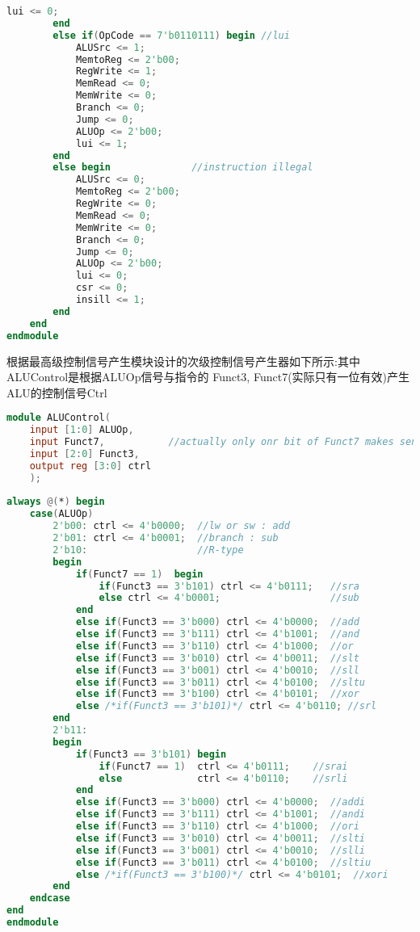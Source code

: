 \begin{lstlisting}[language = {verilog}]
            lui <= 0;
        end
        else if(OpCode == 7'b0110111) begin //lui
            ALUSrc <= 1;
            MemtoReg <= 2'b00; 
            RegWrite <= 1;
            MemRead <= 0;
            MemWrite <= 0;
            Branch <= 0;
            Jump <= 0;
            ALUOp <= 2'b00; 
            lui <= 1;
        end
        else begin              //instruction illegal
            ALUSrc <= 0;
            MemtoReg <= 2'b00; 
            RegWrite <= 0;
            MemRead <= 0;
            MemWrite <= 0;
            Branch <= 0;
            Jump <= 0;
            ALUOp <= 2'b00; 
            lui <= 0;
            csr <= 0;
            insill <= 1;
        end
    end
endmodule
\end{lstlisting}

根据最高级控制信号产生模块设计的次级控制信号产生器如下所示:其中ALUControl是根据ALUOp信号与指令的
Funct3, Funct7(实际只有一位有效)产生ALU的控制信号Ctrl
\begin{lstlisting}[language = {verilog}]
module ALUControl(
    input [1:0] ALUOp,
    input Funct7,           //actually only onr bit of Funct7 makes sense
    input [2:0] Funct3,
    output reg [3:0] ctrl 
    );
    
always @(*) begin
    case(ALUOp)
        2'b00: ctrl <= 4'b0000;  //lw or sw : add
        2'b01: ctrl <= 4'b0001;  //branch : sub
        2'b10:                   //R-type
        begin
            if(Funct7 == 1)  begin
                if(Funct3 == 3'b101) ctrl <= 4'b0111;   //sra
                else ctrl <= 4'b0001;                   //sub
            end
            else if(Funct3 == 3'b000) ctrl <= 4'b0000;  //add
            else if(Funct3 == 3'b111) ctrl <= 4'b1001;  //and
            else if(Funct3 == 3'b110) ctrl <= 4'b1000;  //or
            else if(Funct3 == 3'b010) ctrl <= 4'b0011;  //slt 
            else if(Funct3 == 3'b001) ctrl <= 4'b0010;  //sll
            else if(Funct3 == 3'b011) ctrl <= 4'b0100;  //sltu
            else if(Funct3 == 3'b100) ctrl <= 4'b0101;  //xor
            else /*if(Funct3 == 3'b101)*/ ctrl <= 4'b0110; //srl
        end
        2'b11:
        begin
            if(Funct3 == 3'b101) begin
                if(Funct7 == 1)  ctrl <= 4'b0111;    //srai
                else             ctrl <= 4'b0110;    //srli
            end
            else if(Funct3 == 3'b000) ctrl <= 4'b0000;  //addi
            else if(Funct3 == 3'b111) ctrl <= 4'b1001;  //andi
            else if(Funct3 == 3'b110) ctrl <= 4'b1000;  //ori
            else if(Funct3 == 3'b010) ctrl <= 4'b0011;  //slti 
            else if(Funct3 == 3'b001) ctrl <= 4'b0010;  //slli
            else if(Funct3 == 3'b011) ctrl <= 4'b0100;  //sltiu
            else /*if(Funct3 == 3'b100)*/ ctrl <= 4'b0101;  //xori
        end
    endcase    
end
endmodule
\end{lstlisting}

